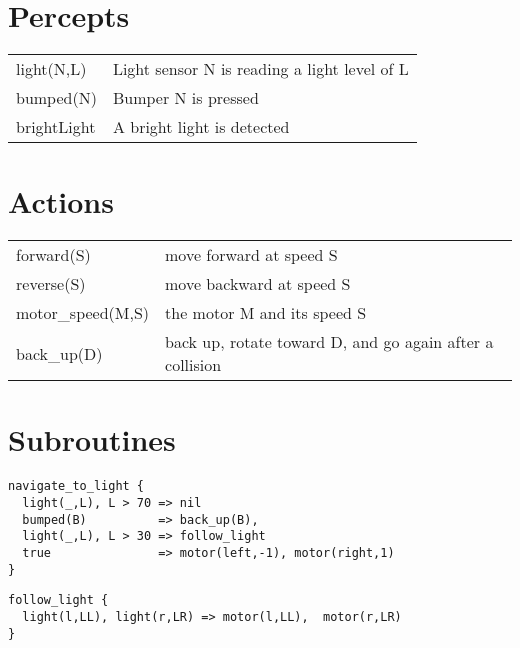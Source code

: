 \documentclass[a4paper]{article}
\begin{document}
\section*{Percepts}

\begin{tabular}{l l}
light(N,L) & Light sensor N is reading a light level of L \\
bumped(N) & Bumper N is pressed \\
brightLight & A bright light is detected \\
\end{tabular}

\section*{Actions}
\begin{tabular}{l l}
forward(S) & move forward at speed S \\
reverse(S) & move backward at speed S \\
motor\_speed(M,S) & the motor M and its speed S \\
back\_up(D) & back up, rotate toward D, and go again after a collision \\
\end{tabular}


\section*{Subroutines}
\begin{verbatim}
navigate_to_light {
  light(_,L), L > 70 => nil
  bumped(B)          => back_up(B),
  light(_,L), L > 30 => follow_light
  true               => motor(left,-1), motor(right,1)
}
\end{verbatim}

\begin{verbatim}
follow_light {
  light(l,LL), light(r,LR) => motor(l,LL),  motor(r,LR)
}
\end{verbatim}
\end{document}
